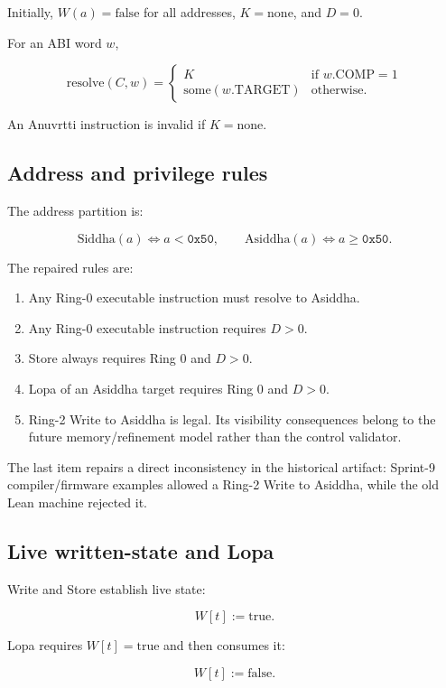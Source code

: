 \documentclass[11pt,a4paper]{article}
\begin{document}
Initially, $W(a)=\mathrm{false}$ for all addresses, $K=\mathrm{none}$, and
$D=0$.

For an ABI word $w$,

\[
\mathrm{resolve}(C,w) =
\begin{cases}
K & \text{if } w.\mathrm{COMP}=1 \\
\mathrm{some}(w.\mathrm{TARGET}) & \text{otherwise.}
\end{cases}
\]

An Anuvrtti instruction is invalid if $K=\mathrm{none}$.

\subsection{Address and privilege rules}

The address partition is:

\[
\mathrm{Siddha}(a) \Leftrightarrow a < \texttt{0x50},
\qquad
\mathrm{Asiddha}(a) \Leftrightarrow a \ge \texttt{0x50}.
\]

The repaired rules are:

\begin{enumerate}
\item Any Ring-0 executable instruction must resolve to Asiddha.
\item Any Ring-0 executable instruction requires $D>0$.
\item Store always requires Ring 0 and $D>0$.
\item Lopa of an Asiddha target requires Ring 0 and $D>0$.
\item Ring-2 Write to Asiddha is legal. Its visibility consequences belong to
      the future memory/refinement model rather than the control validator.
\end{enumerate}

The last item repairs a direct inconsistency in the historical artifact:
Sprint-9 compiler/firmware examples allowed a Ring-2 Write to Asiddha, while
the old Lean machine rejected it.

\subsection{Live written-state and Lopa}

Write and Store establish live state:

\[
W[t] := \mathrm{true}.
\]

Lopa requires $W[t]=\mathrm{true}$ and then consumes it:

\[
W[t] := \mathrm{false}.
\]
\end{document}
